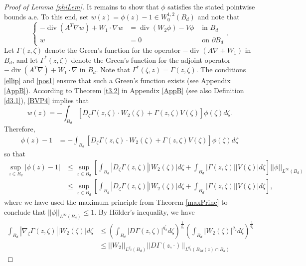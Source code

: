 \documentclass[12pt,reqno]{amsart}
\theoremstyle{plain}
\theoremstyle{definition}
\DeclareMathOperator{\di}{div}
\newcommand{\Ga}{\Gamma}
\newcommand{\iny}{\infty}
\newcommand{\del}{ \partial}
\newcommand{\gr}{\nabla}
\newcommand{\norm}[1]{\left\vert \left\vert #1\right\vert\right\vert}
\newcommand{\abs}[1]{\left\vert#1\right\vert}
\newcommand{\brac}[1]{\left[#1\right]}
\newcommand{\pr}[1]{\left( #1 \right) }
\begin{document}
\begin{proof}[Proof of Lemma \ref{phiLem}]
It remains to show that $\phi$ satisfies the stated pointwise bounds a.e.
To this end, set $w\pr{z} = \phi\pr{z} - 1 \in W^{1,2}_0\pr{B_d}$ and note that
\begin{equation}
\left\{ \begin{array}{rll}
- \di \pr{A^T \gr w } + W_1 \cdot \gr w 
&= \di\pr{W_2 \phi} -V \phi & \text{ in } B_d \\ 
w &= 0  & \text{ on } \del B_d \end{array}\right..
\label{BVP4}
\end{equation}
Let $\Ga\pr{z, \zeta}$ denote the Green's function for the operator $ -\di\pr{A \gr+W_1}$ in $B_d$, and let $\Gamma^\ast(z,\zeta)$ denote the Green's function for the adjoint operator $-\di\pr{A^T\nabla}+W_1\cdot\nabla$ in $B_d$. 
Note that $\Gamma^\ast(\zeta,z)=\Gamma(z,\zeta)$. 
The conditions \eqref{ellip} and \eqref{pos1} ensure that such a Green's function exists (see Appendix \ref{AppB}). 
According to Theorem \ref{t3.2} in Appendix \ref{AppB} (see also Definition \ref{d3.1}), \eqref{BVP4} implies that
$$w\pr{z} = -\int_{B_d} \brac{D_\zeta\Ga\pr{z,\zeta} \cdot W_2\pr{\zeta} + \Ga\pr{z,\zeta} V\pr{\zeta}} \phi\pr{\zeta} d\zeta.$$
Therefore, 
\begin{align*}
\phi\pr{z} - 1 &= - \int_{B_d} \brac{D_\zeta\Ga\pr{z,\zeta} \cdot W_2\pr{\zeta} + \Ga\pr{z,\zeta} V\pr{\zeta}} \phi\pr{\zeta} d\zeta
\end{align*}
so that
\begin{align*}
\sup_{z \in B_d} \abs{\phi\pr{z} - 1}
&\le \sup_{z \in B_d}\brac{\int_{B_d} \abs{D_\zeta \Ga\pr{z,\zeta}} \abs{W_2\pr{\zeta}} d\zeta + \int_{B_d} \abs{\Ga\pr{z,\zeta}} \abs{ V\pr{\zeta}} d\zeta } \norm{\phi}_{L^\iny\pr{B_d}} \\
&\le \sup_{z \in B_d}\brac{\int_{B_d} \abs{D_\zeta \Ga\pr{z,\zeta}} \abs{W_2\pr{\zeta}} d\zeta + \int_{B_d} \abs{\Ga\pr{z,\zeta}} \abs{ V\pr{\zeta}} d\zeta },
\end{align*}
where we have used the maximum principle from Theorem \ref{maxPrinc} to conclude that $\norm{\phi}_{L^\iny\pr{B_d}} \le 1$.
By H\"older's inequality, we have
\begin{align*}
\int_{B_d} \abs{\gr_\zeta \Ga\pr{z,\zeta}} \abs{W_2\pr{\zeta}}d\zeta
&\le \pr{ \int_{B_d} \abs{D\Ga\pr{z,\zeta}}^{q_2^\prime} d\zeta}^{\frac 1 {q_2^\prime}}\pr{ \int_{B_d} \abs{ W_2\pr{\zeta}}^{q_2} d\zeta}^{\frac 1 {q_2}} \\
&\le \norm{W_2}_{L^{q_2}\pr{B_d}} \norm{D\Ga\pr{z,\cdot}}_{L^{q_2^\prime}\pr{B_{2d}\pr{z}\cap B_d}}
\end{align*}

\end{proof}
\end{document}
